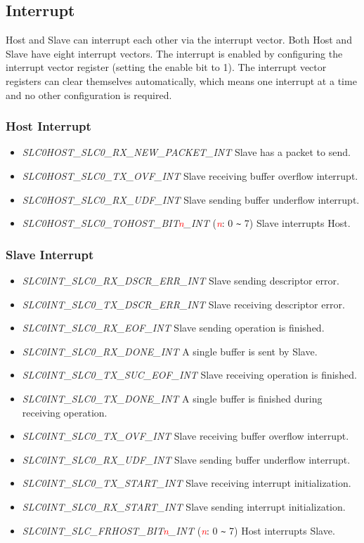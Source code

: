 \documentclass[main\_\_EN.tex]{subfiles}
\begin{document}
\subsection{Interrupt}
Host and Slave can interrupt each other via the interrupt vector. Both Host and Slave have eight interrupt vectors. The interrupt is enabled by configuring the interrupt vector register (setting the enable bit to 1). The interrupt vector registers can clear themselves automatically, which means one interrupt at a time and no other configuration is required.

\subsubsection{Host Interrupt}
\begin{itemize}
\item {\it SLC0HOST\_SLC0\_RX\_NEW\_PACKET\_INT\label{int:SLC0HOSTSLC0RXNEWPACKETINT}} Slave has a packet to send.
\item {\it SLC0HOST\_SLC0\_TX\_OVF\_INT\label{int:SLC0HOSTSLC0TXOVFINT}} Slave receiving buffer overflow interrupt.
\item {\it SLC0HOST\_SLC0\_RX\_UDF\_INT\label{int:SLC0HOSTSLC0RXUDFINT}} Slave sending buffer underflow interrupt.
\item {\it SLC0HOST\_SLC0\_TOHOST\_BIT\textcolor{red}{\it{n}}\_INT\label{int:SLC0HOSTSLC0TOHOSTBITnINT}} (\textcolor{red}{\it{n}}: 0 \verb+~+ 7) Slave interrupts Host.
\end{itemize}

\subsubsection{Slave Interrupt}
\begin{itemize}
\item {\it SLC0INT\_SLC0\_RX\_DSCR\_ERR\_INT} Slave sending descriptor error.
\item {\it SLC0INT\_SLC0\_TX\_DSCR\_ERR\_INT} Slave receiving descriptor error.
\item {\it SLC0INT\_SLC0\_RX\_EOF\_INT} Slave sending operation is finished.
\item {\it SLC0INT\_SLC0\_RX\_DONE\_INT} A single buffer is sent by Slave.
\item {\it SLC0INT\_SLC0\_TX\_SUC\_EOF\_INT} Slave receiving operation is finished.
\item {\it SLC0INT\_SLC0\_TX\_DONE\_INT} A single buffer is finished during receiving operation.
\item {\it SLC0INT\_SLC0\_TX\_OVF\_INT} Slave receiving buffer overflow interrupt.
\item {\it SLC0INT\_SLC0\_RX\_UDF\_INT} Slave sending buffer underflow interrupt.
\item {\it SLC0INT\_SLC0\_TX\_START\_INT} Slave receiving interrupt initialization.
\item {\it SLC0INT\_SLC0\_RX\_START\_INT} Slave sending interrupt initialization.
\item {\it SLC0INT\_SLC\_FRHOST\_BIT\textcolor{red}{\it{n}}\_INT\label{int:SLC0INTSLCFRHOSTBITnINT}} (\textcolor{red}{\it{n}}: 0 \verb+~+ 7) Host interrupts Slave.
\end{itemize}
\end{document}
